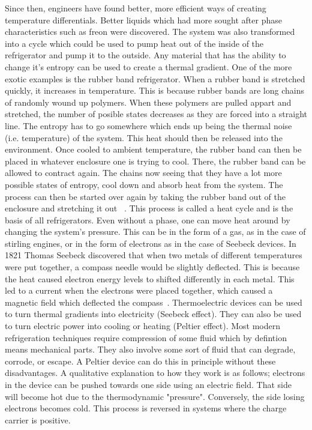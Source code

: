 	Since then, engineers have found better, more efficient ways of creating temperature differentials. Better liquids which had more sought after phase characteristics such as freon were discovered. The system was also transformed into a cycle which could be used to pump heat out of the inside of the refrigerator and pump it to the outside. Any material that has the ability to change it's entropy can be used to create a thermal gradient. One of the more exotic examples is the rubber band refrigerator. When a rubber band is stretched quickly, it increases in temperature. This is because rubber bands are long chains of randomly wound up polymers. When these polymers are pulled appart and stretched, the number of posible states decreases as they are forced into a straight line. The entropy has to go somewhere which ends up being the thermal noise (i.e. temperature) of the system. This heat should then be released into the environment. Once cooled to ambient temperature, the rubber band can then be placed in whatever enclosure one is trying to cool. There, the rubber band can be allowed to contract again. The chains now seeing that they have a lot more possible states of entropy, cool down and absorb heat from the system. The process can then be started over again by taking the rubber band out of the enclosure and stretching it out ~\cite{Brown63}. This process is called a heat cycle and is the basis of all refrigerators. Even without a phase, one can move heat around by changing the system's pressure. This can be in the form of a gas, as in the case of stirling engines, or in the form of electrons as in the case of Seebeck devices. 
	In 1821 Thomas Seebeck discovered that when two metals of different temperatures were put together, a compass needle would be slightly deflected. This is because the heat caused electron energy levels to shifted differently in each metal. This led to a current when the electrons were placed together, which caused a magnetic field which deflected the compass~\cite{Dommelen13}. Thermoelectric devices can be used to turn thermal gradients into electricity (Seebeck effect). They can also be used to turn electric power into cooling or heating (Peltier effect). Most modern refrigeration techniques require compression of some fluid which by defintion means mechanical parts. They also involve some sort of fluid that can degrade, corrode, or escape. A Peltier device can do this in principle without these disadvantages. A qualitative explanation to how they work is as follows; electrons in the device can be pushed towards one side using an electric field. That side will become hot due to the thermodynamic "pressure". Conversely, the side losing electrons becomes cold. This process is reversed in systems where the charge carrier is positive.

